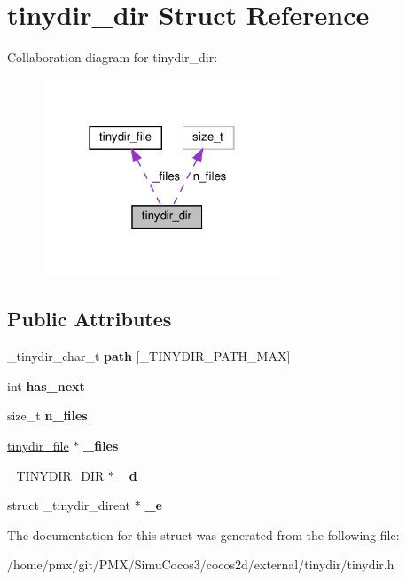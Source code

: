 \hypertarget{structtinydir__dir}{}\section{tinydir\+\_\+dir Struct Reference}
\label{structtinydir__dir}


Collaboration diagram for tinydir\+\_\+dir\+:
\nopagebreak
\begin{figure}[H]
\begin{center}
\leavevmode
\includegraphics[width=202pt]{structtinydir__dir__coll__graph}
\end{center}
\end{figure}
\subsection*{Public Attributes}
\begin{DoxyCompactItemize}
\item 
\mbox{\label{structtinydir__dir_a0c76a062e0ee7714be2c8edd4d539eae}} 
\+\_\+tinydir\+\_\+char\+\_\+t {\bfseries path} \mbox{[}\+\_\+\+T\+I\+N\+Y\+D\+I\+R\+\_\+\+P\+A\+T\+H\+\_\+\+M\+AX\mbox{]}
\item 
\mbox{\label{structtinydir__dir_a199eae7f7fa402e1c3f5195de9beb15b}} 
int {\bfseries has\+\_\+next}
\item 
\mbox{\label{structtinydir__dir_afcb78c8c7847fd984faf7cbb16cf9768}} 
size\+\_\+t {\bfseries n\+\_\+files}
\item 
\mbox{\label{structtinydir__dir_aa410f654a220b8dbe75f492b0285594b}} 
\hyperlink{structtinydir__file}{tinydir\+\_\+file} $\ast$ {\bfseries \+\_\+files}
\item 
\mbox{\label{structtinydir__dir_aab4bd049dd7b5c08579de50a4544b220}} 
\+\_\+\+T\+I\+N\+Y\+D\+I\+R\+\_\+\+D\+IR $\ast$ {\bfseries \+\_\+d}
\item 
\mbox{\label{structtinydir__dir_a806eb8a7b51eeb3f7a131a506d41b6c6}} 
struct \+\_\+tinydir\+\_\+dirent $\ast$ {\bfseries \+\_\+e}
\end{DoxyCompactItemize}


The documentation for this struct was generated from the following file\+:\begin{DoxyCompactItemize}
\item 
/home/pmx/git/\+P\+M\+X/\+Simu\+Cocos3/cocos2d/external/tinydir/tinydir.\+h\end{DoxyCompactItemize}
